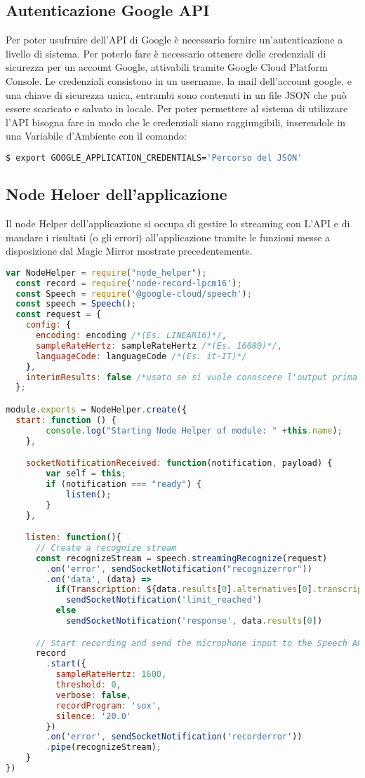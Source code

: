 \subsection{Autenticazione Google API}
Per poter usufruire dell'API di Google è necessario fornire un'autenticazione a livello
di sistema.
Per poterlo fare è necessario ottenere delle credenziali di sicurezza per un account Google,
attivabili tramite Google Cloud Platform Console.
Le credenziali consistono in un username, la mail dell'account google, e una chiave di sicurezza unica,
entrambi sono contenuti in un file JSON che può essere scaricato e salvato in locale.
Per poter permettere al sistema di utilizzare l'API bisogna fare in modo che le credenziali siano
raggiungibili, inserendole in una Variabile d'Ambiente con il comando:
\begin{lstlisting}[language=bash]
  $ export GOOGLE_APPLICATION_CREDENTIALS='Percorso del JSON'
\end{lstlisting}

\subsection{Node Heloer dell'applicazione}
Il node Helper dell'applicazione si occupa di gestire lo streaming con L'API e
di mandare i risultati (o gli errori) all'applicazione tramite le funzioni messe
a disposizione dal Magic Mirror mostrate precedentemente.

\begin{lstlisting}[language=Javascript]
  var NodeHelper = require("node_helper");
  const record = require('node-record-lpcm16');
  const Speech = require('@google-cloud/speech');
  const speech = Speech();
  const request = {
    config: {
      encoding: encoding /*(Es. LINEAR16)*/,
      sampleRateHertz: sampleRateHertz /*(Es. 16000)*/,
      languageCode: languageCode /*(Es. it-IT)*/
    },
    interimResults: false /*usato se si vuole conoscere l'output prima dell'elaborazione*/
  };

module.exports = NodeHelper.create({
  start: function () {
        console.log("Starting Node Helper of module: " +this.name);
    },

    socketNotificationReceived: function(notification, payload) {
        var self = this;
        if (notification === "ready") {
            listen();
        }
    },

    listen: function(){
      // Create a recognize stream
      const recognizeStream = speech.streamingRecognize(request)
        .on('error', sendSocketNotification("recognizerror"))
        .on('data', (data) =>
          if(Transcription: ${data.results[0].alternatives[0].transcript}\n)
            sendSocketNotification('limit_reached')
          else
            sendSocketNotification('response', data.results[0])

      // Start recording and send the microphone input to the Speech API
      record
        .start({
          sampleRateHertz: 1600,
          threshold: 0,
          verbose: false,
          recordProgram: 'sox',
          silence: '20.0'
        })
        .on('error', sendSocketNotification('recorderror'))
        .pipe(recognizeStream);
    }
})
\end{lstlisting}
